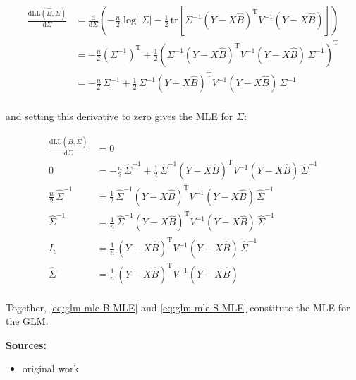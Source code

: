 \documentclass[a4paper,12pt]{book}
\begin{document}
\begin{equation} \label{eq:glm-mle-dLL-dS}
\begin{split}
\frac{\mathrm{d}\mathrm{LL}(\hat{B},\Sigma)}{\mathrm{d}\Sigma} &= \frac{\mathrm{d}}{\mathrm{d}\Sigma} \left( - \frac{n}{2} \log |\Sigma| - \frac{1}{2} \, \mathrm{tr}\left[ \Sigma^{-1} (Y - X\hat{B})^\mathrm{T} V^{-1} (Y - X\hat{B}) \right] \right) \\
&= - \frac{n}{2} \left( \Sigma^{-1} \right)^\mathrm{T} + \frac{1}{2} \left( \Sigma^{-1} (Y - X\hat{B})^\mathrm{T} V^{-1} (Y - X\hat{B}) \, \Sigma^{-1} \right)^\mathrm{T} \\
&= - \frac{n}{2} \, \Sigma^{-1} + \frac{1}{2} \, \Sigma^{-1} (Y - X\hat{B})^\mathrm{T} V^{-1} (Y - X\hat{B}) \, \Sigma^{-1} \\
\end{split}
\end{equation}

and setting this derivative to zero gives the MLE for $\Sigma$:

\begin{equation} \label{eq:glm-mle-S-MLE}
\begin{split}
\frac{\mathrm{d}\mathrm{LL}(\hat{B},\hat{\Sigma})}{\mathrm{d}\Sigma} &= 0 \\
0 &= - \frac{n}{2} \, \hat{\Sigma}^{-1} + \frac{1}{2} \, \hat{\Sigma}^{-1} (Y - X\hat{B})^\mathrm{T} V^{-1} (Y - X\hat{B}) \, \hat{\Sigma}^{-1} \\
\frac{n}{2} \, \hat{\Sigma}^{-1} &= \frac{1}{2} \, \hat{\Sigma}^{-1} (Y - X\hat{B})^\mathrm{T} V^{-1} (Y - X\hat{B}) \, \hat{\Sigma}^{-1} \\
\hat{\Sigma}^{-1} &= \frac{1}{n} \, \hat{\Sigma}^{-1} (Y - X\hat{B})^\mathrm{T} V^{-1} (Y - X\hat{B}) \, \hat{\Sigma}^{-1} \\
I_v &= \frac{1}{n} \, (Y - X\hat{B})^\mathrm{T} V^{-1} (Y - X\hat{B}) \, \hat{\Sigma}^{-1} \\
\hat{\Sigma} &= \frac{1}{n} \, (Y - X\hat{B})^\mathrm{T} V^{-1} (Y - X\hat{B}) \\
\end{split}
\end{equation}

\vspace{1em}
Together, \eqref{eq:glm-mle-B-MLE} and \eqref{eq:glm-mle-S-MLE} constitute the MLE for the GLM.

\vspace{1em}
\textbf{Sources:}
\begin{itemize}
\item original work\end{itemize}
\end{document}
